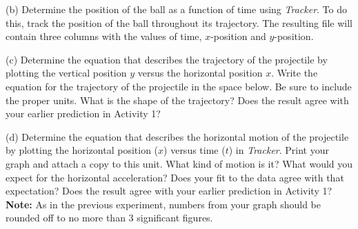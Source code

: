 %

(b) Determine the position of the ball as a function of time using \textit{Tracker}. To do this, 
track the position of the ball throughout its trajectory.  The resulting file will contain three columns 
with the values of time, $x$-position and $y$-position.

(c) Determine the equation that describes the trajectory of the projectile by plotting the vertical 
position $y$ versus the horizontal position $x$. Write the equation for the trajectory of the projectile in the space below. Be sure to include the proper units. What is the shape of the trajectory? Does the result agree with your earlier prediction in Activity 1?
\vspace{10mm}

(d) Determine the equation that describes the horizontal motion of the projectile by plotting the horizontal position ($x$) versus time ($t$) in \textit{Tracker}. Print your graph and attach a copy to this unit.
What kind of motion is it? What would you expect for the horizontal acceleration? Does your fit to the data agree with that expectation? Does the result agree with your earlier prediction in Activity 1?
\textbf{Note:} As in the previous experiment, numbers from your graph should be rounded off to no more than 3 significant figures.
\vspace{15mm}

